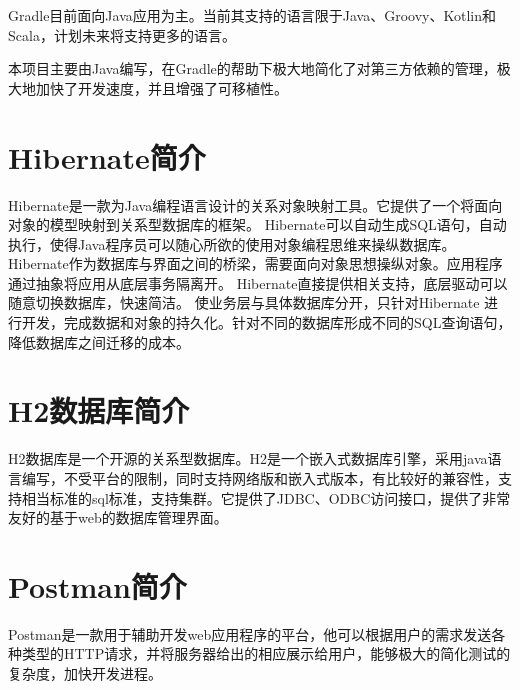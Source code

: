 Gradle目前面向Java应用为主。当前其支持的语言限于Java、Groovy、Kotlin和Scala，计划未来将支持更多的语言。

本项目主要由Java编写，在Gradle的帮助下极大地简化了对第三方依赖的管理，极大地加快了开发速度，并且增强了可移植性。

\section{Hibernate简介}

Hibernate是一款为Java编程语言设计的关系对象映射工具。它提供了一个将面向对象的模型映射到关系型数据库的框架。
Hibernate可以自动生成SQL语句，自动执行，使得Java程序员可以随心所欲的使用对象编程思维来操纵数据库。
Hibernate作为数据库与界面之间的桥梁，需要面向对象思想操纵对象。应用程序通过抽象将应用从底层事务隔离开。
Hibernate直接提供相关支持，底层驱动可以随意切换数据库，快速简洁。
使业务层与具体数据库分开，只针对Hibernate 进行开发，完成数据和对象的持久化。针对不同的数据库形成不同的SQL查询语句，降低数据库之间迁移的成本。

\section{H2数据库简介}

H2数据库是一个开源的关系型数据库。H2是一个嵌入式数据库引擎，采用java语言编写，不受平台的限制，同时支持网络版和嵌入式版本，有比较好的兼容性，支持相当标准的sql标准，支持集群。它提供了JDBC、ODBC访问接口，提供了非常友好的基于web的数据库管理界面。

\section{Postman简介}

Postman是一款用于辅助开发web应用程序的平台，他可以根据用户的需求发送各种类型的HTTP请求，并将服务器给出的相应展示给用户，能够极大的简化测试的复杂度，加快开发进程。























